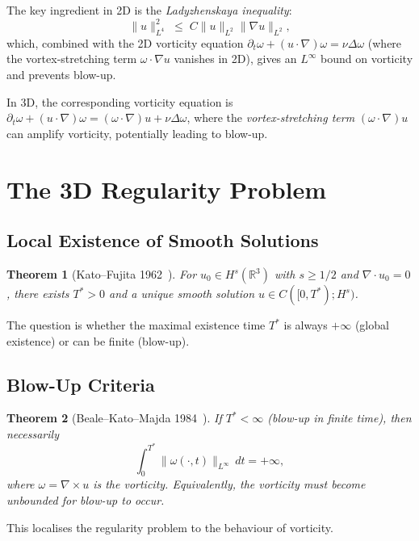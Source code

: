 \documentclass[12pt,a4paper]{article}
\newtheorem{theorem}{Theorem}[section]
\theoremstyle{remark}
\begin{document}
The key ingredient in 2D is the \emph{Ladyzhenskaya inequality}:
\[
  \|u\|_{L^4}^2 \;\leq\; C\|u\|_{L^2}\|\nabla u\|_{L^2},
\]
which, combined with the 2D vorticity equation $\partial_t \omega + (u\cdot\nabla)\omega = \nu\Delta\omega$
(where the vortex-stretching term $\omega\cdot\nabla u$ vanishes in 2D), gives an
$L^\infty$ bound on vorticity and prevents blow-up.

In 3D, the corresponding vorticity equation is
$\partial_t \omega + (u\cdot\nabla)\omega = (\omega\cdot\nabla)u + \nu\Delta\omega$,
where the \emph{vortex-stretching term} $(\omega\cdot\nabla)u$ can amplify vorticity,
potentially leading to blow-up.

\section{The 3D Regularity Problem}

\subsection{Local Existence of Smooth Solutions}

\begin{theorem}[Kato--Fujita 1962~\cite{KatoFujita1962}]
  For $u_0 \in H^s(\mathbb{R}^3)$ with $s \geq 1/2$ and $\nabla\cdot u_0=0$, there
  exists $T^* > 0$ and a unique smooth solution $u \in C([0,T^*); H^s)$.
\end{theorem}

The question is whether the maximal existence time $T^*$ is always $+\infty$ (global
existence) or can be finite (blow-up).

\subsection{Blow-Up Criteria}

\begin{theorem}[Beale--Kato--Majda 1984~\cite{BKM1984}]
  If $T^* < \infty$ (blow-up in finite time), then necessarily
  \[
    \int_0^{T^*} \|\omega(\cdot,t)\|_{L^\infty}\,dt = +\infty,
  \]
  where $\omega = \nabla \times u$ is the vorticity.  Equivalently, the vorticity must
  become unbounded for blow-up to occur.
\end{theorem}

This localises the regularity problem to the behaviour of vorticity.
\end{document}
